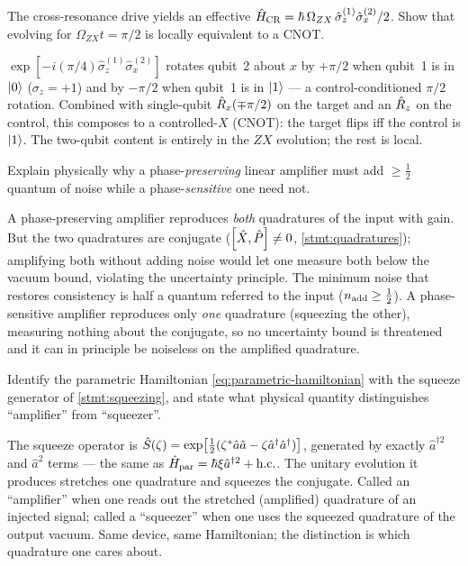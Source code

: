 \begin{exercise}
The cross-resonance drive yields an effective
$\hat{H}_{\rm CR}=\hbar\,\Omega_{ZX}\,\hat\sigma_z^{(1)}\hat\sigma_x^{(2)}/2$.
Show that evolving for $\Omega_{ZX}t=\pi/2$ is locally equivalent to a
CNOT.
\begin{solution}
$\exp[-i(\pi/4)\hat\sigma_z^{(1)}\hat\sigma_x^{(2)}]$ rotates qubit~2
about $x$ by $+\pi/2$ when qubit~1 is in $\ket0$ ($\sigma_z=+1$) and by
$-\pi/2$ when qubit~1 is in $\ket1$ --- a control-conditioned $\pi/2$
rotation. Combined with single-qubit $\hat{R}_x(\mp\pi/2)$ on the target
and an $\hat{R}_z$ on the control, this composes to a controlled-$X$
(CNOT): the target flips iff the control is $\ket1$. The two-qubit
content is entirely in the $ZX$ evolution; the rest is local.
\end{solution}
\end{exercise}

\begin{exercise}
Explain physically why a phase-\emph{preserving} linear amplifier must
add $\ge\tfrac12$ quantum of noise while a phase-\emph{sensitive} one
need not.
\begin{solution}
A phase-preserving amplifier reproduces \emph{both} quadratures of the
input with gain. But the two quadratures are conjugate
($\comm{\hat X}{\hat P}\neq0$, \cref{stmt:quadratures}); amplifying both
without adding noise would let one measure both below the vacuum bound,
violating the uncertainty principle. The minimum noise that restores
consistency is half a quantum referred to the input
($n_{\rm add}\ge\tfrac12$). A phase-sensitive amplifier reproduces only
\emph{one} quadrature (squeezing the other), measuring nothing about
the conjugate, so no uncertainty bound is threatened and it can in
principle be noiseless on the amplified quadrature.
\end{solution}
\end{exercise}

\begin{exercise}
Identify the parametric Hamiltonian \cref{eq:parametric-hamiltonian}
with the squeeze generator of \cref{stmt:squeezing}, and state what
physical quantity distinguishes ``amplifier'' from ``squeezer''.
\begin{solution}
The squeeze operator is
$\hat{S}(\zeta)=\exp[\tfrac12(\zeta^*\hat a\hat a-\zeta\hat a^\dagger\hat a^\dagger)]$,
generated by exactly $\hat a^{\dagger2}$ and $\hat a^2$ terms --- the
same as $\hat{H}_{\rm par}=\hbar\xi\hat a^{\dagger2}+\text{h.c.}$. The unitary
evolution it produces stretches one quadrature and squeezes the
conjugate. Called an ``amplifier'' when one reads out the stretched
(amplified) quadrature of an injected signal; called a ``squeezer''
when one uses the squeezed quadrature of the output vacuum. Same
device, same Hamiltonian; the distinction is which quadrature one cares
about.
\end{solution}
\end{exercise}


